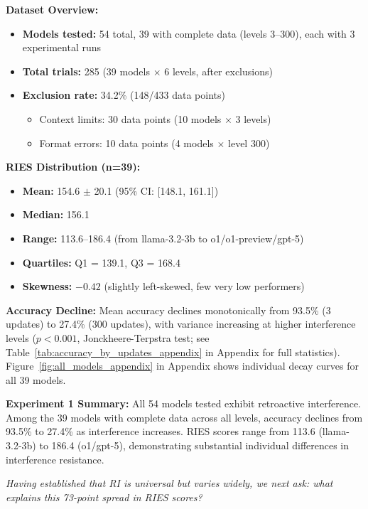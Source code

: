 \documentclass{article}
\begin{document}
\textbf{Dataset Overview:}
\begin{itemize}[itemsep=2pt,topsep=3pt,parsep=0pt]
    \item \textbf{Models tested:} 54 total, 39 with complete data (levels 3--300), each with 3 experimental runs
    \item \textbf{Total trials:} 285 (39 models $\times$ 6 levels, after exclusions)
    \item \textbf{Exclusion rate:} 34.2\% (148/433 data points)
    \begin{itemize}[itemsep=2pt,topsep=3pt,parsep=0pt]
        \item Context limits: 30 data points (10 models $\times$ 3 levels)
        \item Format errors: 10 data points (4 models $\times$ level 300)
    \end{itemize}
\end{itemize}

\textbf{RIES Distribution (n=39):}
\begin{itemize}[itemsep=2pt,topsep=3pt,parsep=0pt]
    \item \textbf{Mean:} 154.6 $\pm$ 20.1 (95\% CI: [148.1, 161.1])
    \item \textbf{Median:} 156.1
    \item \textbf{Range:} 113.6--186.4 (from llama-3.2-3b to o1/o1-preview/gpt-5)
    \item \textbf{Quartiles:} Q1 = 139.1, Q3 = 168.4
    \item \textbf{Skewness:} $-0.42$ (slightly left-skewed, few very low performers)
\end{itemize}

\textbf{Accuracy Decline:} Mean accuracy declines monotonically from 93.5\% (3 updates) to 27.4\% (300 updates), with variance increasing at higher interference levels ($p < 0.001$, Jonckheere-Terpstra test; see Table~\ref{tab:accuracy_by_updates_appendix} in Appendix for full statistics). Figure~\ref{fig:all_models_appendix} in Appendix shows individual decay curves for all 39 models.

\textbf{Experiment 1 Summary:} All 54 models tested exhibit retroactive interference. Among the 39 models with complete data across all levels, accuracy declines from 93.5\% to 27.4\% as interference increases. RIES scores range from 113.6 (llama-3.2-3b) to 186.4 (o1/gpt-5), demonstrating substantial individual differences in interference resistance.

\vspace{3pt}
\noindent\textit{Having established that RI is universal but varies widely, we next ask: what explains this 73-point spread in RIES scores?}
\vspace{3pt}
\end{document}

